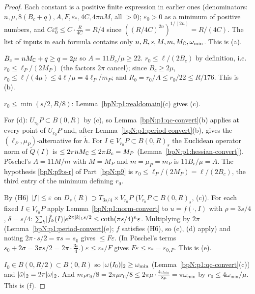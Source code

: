 \begin{proof}
\label{stepN:p1:co-pos} Each constant is a positive finite expression in earlier ones (denominators: $n,\mu,8(B_c+q),A,F,\varepsilon_*,4C,4\pi nM$, all $>0$); $\varepsilon_0>0$ as a minimum of positive numbers, and $C\varepsilon_0^a\le C\cdot\frac R{4C}=R/4$ since $((R/4C)^{2n})^{1/(2n)}=R/(4C)$. The list of inputs in each formula contains only $n,R,s,M,m,M_{\mathbb{C}},\omega_{\min}$. This is (a).

\label{stepN:p1:co-size} $B_c=nM_{\mathbb{C}}+q\ge q=2\mu$ so $A=11B_c/\mu\ge22$. $r_0\le\ell/(2B_c)$ by definition, i.e.\ $r_0\le\ell_P/(2M_P)$ (the factors $2\pi$ cancel); since $B_c\ge2\mu$, $r_0\le\ell/(4\mu)\le4\ell/\mu=4\ell_P/m_P$; and $R_0=r_0/A\le r_0/22\le R/176$. This is (b).

\label{stepN:p1:co-tubes} $r_0\le\min(s/2,R/8)$: Lemma~\ref{bpN:p1:realdomain}(c) gives (c).

\label{stepN:p1:co-qc} For (d): $U_{r_0}P\subset B(0,R)$ by (c), so Lemma~\ref{bpN:p1:qc-convert}(b) applies at every point of $U_{r_0}P$ and, after Lemma~\ref{bpN:p1:period-convert}(b), gives the $(\ell_P,\mu_P)$-alternative for $\tilde h$. For $I\in V_{r_0}P\subset B(0,R)_s$ the Euclidean operator norm of $\tilde Q(I)$ is $\le2\pi nM_{\mathbb{C}}\le2\pi B_c=M_P$ (Lemma~\ref{bpN:p1:hessian-convert}). P\"oschel's $A=11M/m$ with $M=M_P$ and $m=\mu_P=m_P$ is $11B_c/\mu=A$. The hypothesis \ref{bpN:p9:s-r} of Part~\ref{bpN:p9} is $r_0\le\ell_P/(2M_P)=\ell/(2B_c)$, the third entry of the minimum defining $r_0$.

\label{stepN:p1:co-pert} By (H6) $\lvert f\rvert\le\varepsilon$ on $D_s(R)\supset T_{3s/4}\times V_{r_0}P$ ($V_{r_0}P\subset B(0,R)_s$, (c)). For each fixed $I\in V_{r_0}P$ apply Lemma~\ref{bpN:p1:norm-convert} to $u=f(\cdot,I)$ with $\rho=3s/4$, $\delta=s/4$: $\sum_k\lvert \hat f_k(I)\rvert e^{2\pi\lvert k\rvert_1s/2}\le\coth(\pi s/4)^n\varepsilon$. Multiplying by $2\pi$ (Lemma~\ref{bpN:p1:period-convert}(e); $f$ satisfies (H6), so (c), (d) apply) and noting $2\pi\cdot s/2=\pi s=s_0$ gives $\le F\varepsilon$. (In P\"oschel's terms $s_0+2\sigma=3\pi s/2=2\pi\cdot\frac{3s}4$.) $\varepsilon\le\varepsilon_*/F$ gives $F\varepsilon\le\varepsilon_*=\varepsilon_{0,P}$. This is (e).

\label{stepN:p1:co-exc} $I_0\in B(0,R/2)\subset B(0,R)$ so $\lvert \omega(I_0)\rvert_2\ge\omega_{\min}$ (Lemma~\ref{bpN:p1:qc-convert}(c)) and $\lvert \tilde\omega\rvert_2=2\pi\lvert \omega\rvert_2$. And $m_Pr_0/8=2\pi\mu r_0/8\le2\pi\mu\cdot\frac{4\omega_{\min}}{8\mu}=\pi\omega_{\min}$ by $r_0\le4\omega_{\min}/\mu$. This is (f).


\end{proof}
